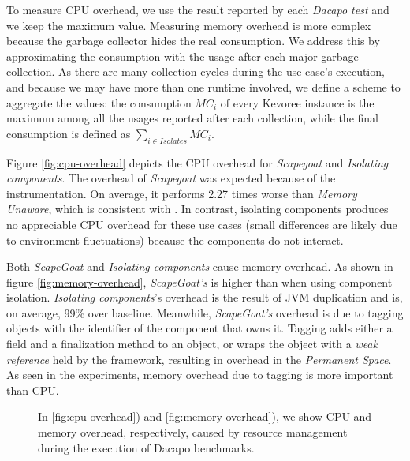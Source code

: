 To measure CPU overhead, we use the result reported by each \textit{Dacapo test} and we keep the maximum value.
Measuring memory overhead is more complex because the garbage collector hides the real consumption.
We address this by approximating the consumption with the usage after each major garbage collection.
As there are many collection cycles during the use case's execution, and because we may have more than one runtime involved, we define a scheme to aggregate the values: the consumption $MC_i$ of every Kevoree instance is the maximum among all the usages reported after each collection, while the final consumption is defined as $\sum_{i \in \mathit{Isolates}} {\textit{MC}}_i$.

Figure \ref{fig:cpu-overhead} depicts the CPU overhead for \textit{Scapegoat} and \textit{Isolating components}.
The overhead of \textit{Scapegoat} was expected because of the instrumentation.
On average, it performs 2.27 times worse than \textit{Memory Unaware}, which is consistent with \cite{gonzalezherrera:hal-00983045}.
In contrast, isolating components produces no appreciable CPU overhead for these use cases (small differences are likely due to environment fluctuations) because the components do not interact.

Both \textit{ScapeGoat} and \textit{Isolating components} cause memory overhead.
As shown in figure \ref{fig:memory-overhead}, \textit{ScapeGoat's} is higher than when using component isolation.
\textit{Isolating components}'s overhead is the result of JVM duplication and is, on average, 99\% over baseline.
Meanwhile, \textit{ScapeGoat's} overhead is due to tagging objects with the identifier of the component that owns it.
Tagging adds either a field and a finalization method to an object, or wraps the object with a \textit{weak reference} held by the framework, resulting in overhead in the \textit{Permanent Space}.
As seen in the experiments, memory overhead due to tagging is more important than CPU. 

\begin{figure*}

%
%
\caption{In \ref{fig:cpu-overhead}) and \ref{fig:memory-overhead}), we show CPU and memory overhead, respectively, caused by resource management during the execution of Dacapo benchmarks.}
\vspace{-0.5cm}
\end{figure*}


